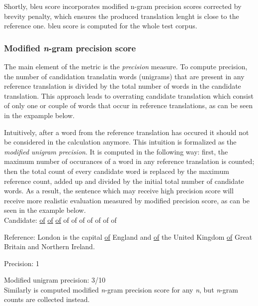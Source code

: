 Shortly, \acrshort{bleu} score incorporates modified n-gram precision scores
corrected by brevity penalty,
which ensures the produced translation lenght is close to the reference one.
\acrshort{bleu} score is computed for the whole test corpus.

\subsubsection*{Modified \textit{n}-gram precision score}

The main element of the metric is the \textit{precision} measure.
To compute precision, the number of candidation translatin words (unigrams) that are present in
any reference translation is divided by the total number of words in the candidate translation.
This approach leads to overrating candidate translation which consist of only one or couple of
words that occur in reference translations, as can be seen in the expample below.

Intuitively, after a word from the reference translation has occured it should not be considered
in the calculation anymore.
This intuition is formalized as the \textit{modified unigram precision}.
It is computed in the following way: first, the maximum number of occurances of a word in any
reference translation is counted; then the total count of every candidate word is replaced by the
maximum reference count, added up and divided by the initial total number of candidate words.
As a result, the sentence which may receive high precision score will receive more realistic evaluation
measured by modified precision score, as can be seen in the example below.\\

Candidate: \underline{of} \underline{of} \underline{of} of of of of of of of

Reference: London is the capital \underline{of} England and \underline{of} the United Kingdom
\underline{of} Great Britain and Northern Ireland.

Precision: 1

Modified unigram precision: 3/10
\\
Similarly is computed modified \textit{n}-gram precision score for any \textit{n}, but \textit{n}-gram
counts are collected instead.

\subsubsection*{}

